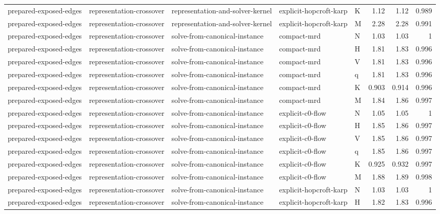 \begin{table}[t]
\begin{tabular}{lllllrrr}
prepared-exposed-edges & representation-crossover & representation-and-solver-kernel & explicit-hopcroft-karp & K & 1.12 & 1.12 & 0.989 \\
prepared-exposed-edges & representation-crossover & representation-and-solver-kernel & explicit-hopcroft-karp & M & 2.28 & 2.28 & 0.991 \\
prepared-exposed-edges & representation-crossover & solve-from-canonical-instance & compact-mrd & N & 1.03 & 1.03 & 1 \\
prepared-exposed-edges & representation-crossover & solve-from-canonical-instance & compact-mrd & H & 1.81 & 1.83 & 0.996 \\
prepared-exposed-edges & representation-crossover & solve-from-canonical-instance & compact-mrd & V & 1.81 & 1.83 & 0.996 \\
prepared-exposed-edges & representation-crossover & solve-from-canonical-instance & compact-mrd & q & 1.81 & 1.83 & 0.996 \\
prepared-exposed-edges & representation-crossover & solve-from-canonical-instance & compact-mrd & K & 0.903 & 0.914 & 0.996 \\
prepared-exposed-edges & representation-crossover & solve-from-canonical-instance & compact-mrd & M & 1.84 & 1.86 & 0.997 \\
prepared-exposed-edges & representation-crossover & solve-from-canonical-instance & explicit-c0-flow & N & 1.05 & 1.05 & 1 \\
prepared-exposed-edges & representation-crossover & solve-from-canonical-instance & explicit-c0-flow & H & 1.85 & 1.86 & 0.997 \\
prepared-exposed-edges & representation-crossover & solve-from-canonical-instance & explicit-c0-flow & V & 1.85 & 1.86 & 0.997 \\
prepared-exposed-edges & representation-crossover & solve-from-canonical-instance & explicit-c0-flow & q & 1.85 & 1.86 & 0.997 \\
prepared-exposed-edges & representation-crossover & solve-from-canonical-instance & explicit-c0-flow & K & 0.925 & 0.932 & 0.997 \\
prepared-exposed-edges & representation-crossover & solve-from-canonical-instance & explicit-c0-flow & M & 1.88 & 1.89 & 0.998 \\
prepared-exposed-edges & representation-crossover & solve-from-canonical-instance & explicit-hopcroft-karp & N & 1.03 & 1.03 & 1 \\
prepared-exposed-edges & representation-crossover & solve-from-canonical-instance & explicit-hopcroft-karp & H & 1.82 & 1.83 & 0.996 \\

\end{tabular}
\end{table}
